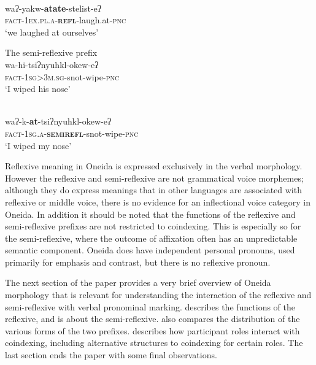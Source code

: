 \documentclass[output=paper]{langscibook}
\begin{document}
  \ex 
   \label{ex:oneida:1b}
  \\
    waʔ-yakw-\textbf{atate}{}-stelist-eʔ\\
        \textsc{fact}-\textsc{1ex.pl.a-}\textbf{\textsc{refl}}-laugh.at-\textsc{pnc}\\
    \glt ‘we laughed at ourselves’
    \z
\z

\ea%
The semi-reflexive prefix
    \label{ex:oneida:2}
    \ea 
    \label{ex:oneida:2a}
    \\
     wa-hi-tsiʔnyuhkl-okew-eʔ\\
         \textsc{fact-1sg>3m.sg}-snot-wipe-\textsc{pnc}\\
    \glt ‘I wiped his nose’

    \ex  
    \label{ex:oneida:2b}
    \\
     waʔ-k-\textbf{at}{}-tsiʔnyuhkl-okew-eʔ\\
       \textsc{fact-1sg.a-}\textbf{\textsc{semirefl}}-snot-wipe-\textsc{pnc}\\
    \glt ‘I wiped my nose’    
   \z
\z

Reflexive meaning in Oneida is expressed exclusively in the verbal morphology. However the reflexive and semi-reflexive are not grammatical voice morphemes; although they do express meanings that in other languages are associated with reflexive or middle voice, there is no evidence for an inflectional voice category in Oneida. In addition it should be noted that the functions of the reflexive and semi-reflexive prefixes are not restricted to coindexing. This is especially so for the semi-reflexive, where the outcome of affixa\-tion often has an unpredictable semantic component. Oneida does have independent personal pronouns, used primarily for emphasis and contrast, but there is no reflexive pronoun.

The next section of the paper provides a very brief overview of Oneida morphology that is relevant for understanding the interaction of the reflexive and semi-reflexive with verbal pronominal marking.  describes the functions of the reflexive, and  is about the semi-reflexive.  also compares the distribution of the various forms of the two prefixes.  describes how participant roles interact with coindexing, including alternative structures to coindexing for certain roles. The last section ends the paper with some final observations.
\end{document}
